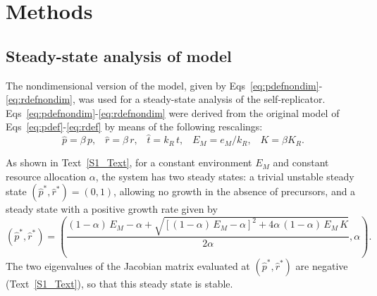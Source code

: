 \documentclass[10pt,letterpaper]{article}
\date{}
\newcommand{\tr}[1]{{\color{red} #1}}
\begin{document}
\vspace*{0.35in}






\linenumbers



\tr{
\section*{Methods}

\subsection*{Steady-state analysis of model}
\label{sec:methods_model_analysis}

The nondimensional version of the model, given by Eqs~\ref{eq:pdefnondim}-\ref{eq:rdefnondim}, was used for a steady-state analysis of the self-replicator.
Eqs~\ref{eq:pdefnondim}-\ref{eq:rdefnondim} were derived from the original model of Eqs~\ref{eq:pdef}-\ref{eq:rdef} by means of the following rescalings:
\begin{equation*}
\hat{p}  = \beta \, p,\;\;\;
\hat{r}  = \beta \, r,\;\;\;
\hat{t}  = k_R \, t,\;\;\;
E_M = e_M/k_R,\;\;\;
K = \beta K_R.
\end{equation*}

As shown in Text~\ref{S1_Text}, for a constant environment $E_M$ and constant resource allocation $\alpha$, the system has two steady states: a trivial unstable steady state $(\hat{p}^*, \hat{r}^*) = (0,1)$, allowing no growth in the absence of precursors, and a steady state with a positive growth rate given by
\begin{equation}
\label{eq:meth_steadystate}
(\hat{p}^*, \hat{r}^*) = \left( \frac{(1-\alpha)\, E_M - \alpha + \sqrt{[(1-\alpha)\, E_M - \alpha]^2 + 4\alpha\, (1-\alpha)\, E_M\, K}}{2\alpha}, \alpha \right).
\end{equation}
The two eigenvalues of the Jacobian matrix evaluated at $(\hat{p}^*, \hat{r}^*)$ are negative (Text~\ref{S1_Text}), so that this steady state is stable.

}
\end{document}
